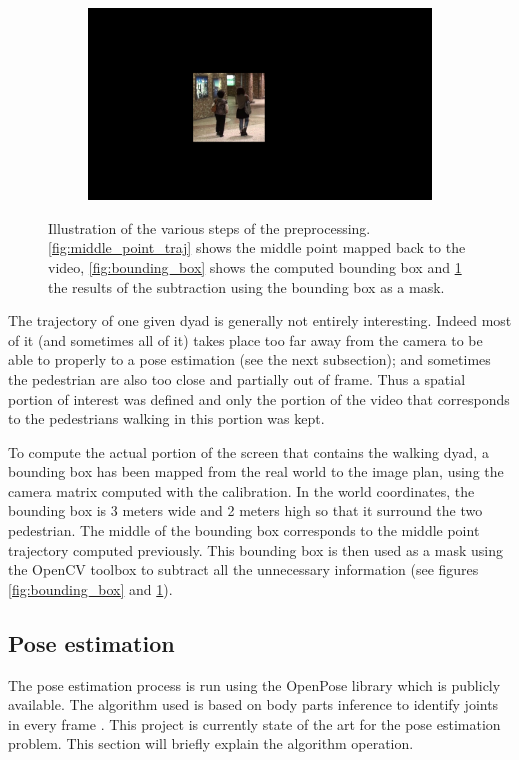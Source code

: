 \documentclass[12pt,a4paper,twoside]{article}
\begin{document}
\begin{figure}
\begin{subfigure}[b]{0.45\textwidth}
        \includegraphics[width=\textwidth]{images/masked}
        \caption{}
        \label{fig:masked}
    \end{subfigure}
    \caption{Illustration of the various steps of the preprocessing. \ref{fig:middle_point_traj} shows the middle point mapped back to the video, \ref{fig:bounding_box} shows the computed bounding box and \ref{fig:masked} the results of the subtraction using the bounding box as a mask.}\label{fig:preprocessing}
\end{figure}

The trajectory of one given dyad is generally not entirely interesting. Indeed most of it (and sometimes all of it) takes place too far away from the camera to be able to properly to a pose estimation (see the next subsection); and sometimes the pedestrian are also too close and partially out of frame. Thus a spatial \guillemotleft portion of interest \guillemotright was defined and only the portion of the video that corresponds to the pedestrians walking in this portion was kept.

To compute the actual portion of the screen that contains the walking dyad, a bounding box has been mapped from the real world to the image plan, using the camera matrix computed with the calibration. In the world coordinates, the bounding box is 3 meters wide and 2 meters high so that it surround the two pedestrian. The middle of the bounding box corresponds to the middle point trajectory computed previously. This bounding box is then used as a mask using the OpenCV toolbox to subtract all the unnecessary information (see figures \ref{fig:bounding_box} and \ref{fig:masked}).

\subsection{Pose estimation}
The pose estimation process is run using the OpenPose library which is publicly available. The algorithm used is based on body parts inference to identify joints in every frame \cite{Cao2016}. This project is currently state of the art for the pose estimation problem. This section will briefly explain the algorithm operation.
\end{document}

